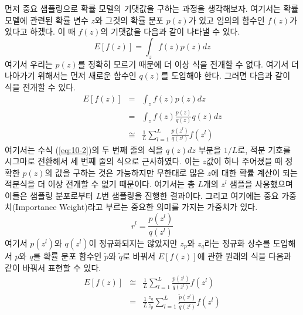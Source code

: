 \documentclass[a4paper]{oblivoir}
\begin{document}
먼저 중요 샘플링으로 확률 모델의 기댓값을 구하는 과정을 생각해보자. 여기서는 확률 모델에 관련된 확률 변수 $z$와 그것의 확률 분포 $p(z)$가 있고 임의의 함수인 $f(z)$가 있다고 하겠다. 이 때 $f(z)$의 기댓값을 다음과 같이 나타낼 수 있다.
\begin{equation}
E[f(z)] = \int_{z} f(z)p(z)dz
\label{eq:10-1}
\end{equation} 
여기서 우리는 $p(z)$를 정확히 모르기 때문에 더 이상 식을 전개할 수 없다. 여기서 더 나아가기 위해서는 먼저 새로운 함수인 $q(z)$를 도입해야 한다. 그러면 다음과 같이 식을 전개할 수 있다.
\begin{eqnarray}
E[f(z)] & = & \int_{z} f(z)p(z)dz \nonumber \\
& = & \int_{z} f(z) \frac{p(z)}{q(z)} q(z) dz \nonumber \\
& \cong & \frac{1}{L} \sum_{l=1}^{L} \frac{p(z^{l})}{q(z^{l})}f(z^{l}) \label{eq:10-2}
\end{eqnarray} 
여기서는 수식 (\ref{eq:10-2})의 두 번째 줄의 식을 $q(z)dz$ 부분을 $1/L$로, 적분 기호를 시그마로 전환해서 세 번째 줄의 식으로 근사하였다. 이는 $z$값이 하나 주어졌을 때 정확한 $p(z)$의 값을 구하는 것은 가능하지만 무한대로 많은 $z$에 대한 확률 계산이 되는 적분식을 더 이상 전개할 수 없기 때문이다. 여기서는 총 $L$개의 $z^{l}$ 샘플을 사용했으며 이들은 샘플링 분포로부터 $L$번 샘플링을 진행한 결과이다. 그리고 여기에는 중요 가중치(Importance Weight)라고 부르는 중요한 의미를 가지는 가중치가 있다. 
\begin{equation}
r^{l} = \frac{p(z^{l})}{q(z^{l})}
\label{eq:10-2-1} 
\end{equation} 
여기서 $p(z^{l})$와 $q(z^{l})$이 정규화되지는 않았지만 $z_{p}$와 $z_{q}$라는 정규화 상수를 도입해서 $p$와 $q$를 확률 분포 함수인 $\tilde{p}$와 $\tilde{q}$로 바꿔서 $E[f(z)]$에 관한 원래의 식을 다음과 같이 바꿔서 표현할 수 있다. 
\begin{eqnarray}
E[f(z)] & \cong & \frac{1}{L} \sum_{l=1}^{L} \frac{p(z^{l})}{q(z^{l})}f(z^{l}) \nonumber \\
& = &  \frac{1}{L} \frac{z_{q}}{z_{p}} \sum_{l=1}^{L} \frac{\tilde{p}(z^{l})}{\tilde{q}(z^{l})}f(z^{l}) \label{eq:10-2-2}
\end{eqnarray} 
\end{document}
